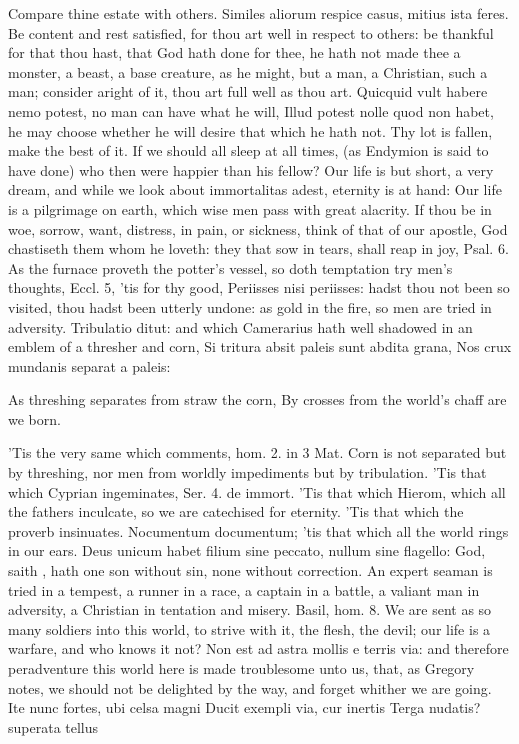 {Compare thine estate with others. Similes aliorum respice casus, mitius
ista feres. Be content and rest satisfied, for thou art well in respect
to others: be thankful for that thou hast, that God hath done for thee,
he hath not made thee a monster, a beast, a base creature, as he might,
but a man, a Christian, such a man; consider aright of it, thou art
full well as thou art. Quicquid vult habere nemo potest, no man
can have what he will, Illud potest nolle quod non habet, he may choose
whether he will desire that which he hath not. Thy lot is fallen, make
the best of it. If we should all sleep at all times, (as Endymion
is said to have done) who then were happier than his fellow? Our life
is but short, a very dream, and while we look about immortalitas
adest, eternity is at hand: Our life is a pilgrimage on earth,
which wise men pass with great alacrity. If thou be in woe, sorrow,
want, distress, in pain, or sickness, think of that of our apostle, God
chastiseth them whom he loveth: they that sow in tears, shall reap in
joy, Psal.  6. As the furnace proveth the potter's vessel, so
doth temptation try men's thoughts, Eccl.  5, 'tis for thy
good, Periisses nisi periisses: hadst thou not been so visited, thou
hadst been utterly undone: as gold in the fire, so men are tried in
adversity. Tribulatio ditut: and which Camerarius hath well shadowed in
an emblem of a thresher and corn,
Si tritura absit paleis sunt abdita grana,
Nos crux mundanis separat a paleis:

As threshing separates from straw the corn,
By crosses from the world's chaff are we born.

'Tis the very same which \Chrysostom comments, hom. 2. in 3 Mat.
Corn is not separated but by threshing, nor men from worldly
impediments but by tribulation. 'Tis that which Cyprian
ingeminates, Ser. 4. de immort. 'Tis that which Hierom, which all
the fathers inculcate, so we are catechised for eternity. 'Tis that
which the proverb insinuates. Nocumentum documentum; 'tis that which
all the world rings in our ears. Deus unicum habet filium sine peccato,
nullum sine flagello: God, saith \Austin{}, hath one son without
sin, none without correction. An expert seaman is tried in a
tempest, a runner in a race, a captain in a battle, a valiant man in
adversity, a Christian in tentation and misery. Basil, hom. 8. We are
sent as so many soldiers into this world, to strive with it, the flesh,
the devil; our life is a warfare, and who knows it not? Non est
ad astra mollis e terris via: and therefore peradventure this
world here is made troublesome unto us, that, as Gregory notes, we
should not be delighted by the way, and forget whither we are going.
Ite nunc fortes, ubi celsa magni
Ducit exempli via, cur inertis
Terga nudatis? superata tellus

}
